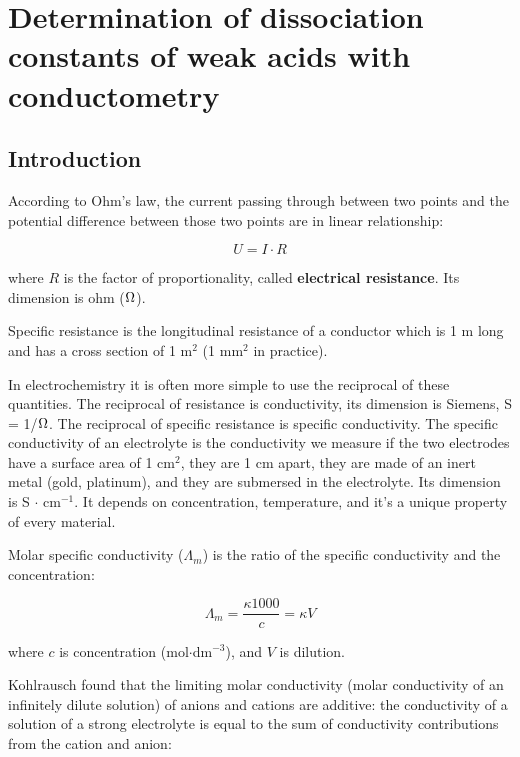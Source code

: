 \fancyhead[LO,RE]{\thesection}
\fancyfoot[LE,RO]{\thepage}

\section{Determination of dissociation constants of weak acids with conductometry}
\subsection{Introduction}
According to Ohm's law, the current passing through between two points and the potential difference between those two points are in linear relationship:

\begin{equation}
\label{eq:ohm}
	U
	=
	I
	\cdot
	R
\end{equation}

where $R$ is the factor of proportionality, called \textbf{electrical resistance}. Its dimension is ohm ($\ohm$).

Specific resistance is the longitudinal resistance of a conductor which is 1 m long and has a cross section of 1 m$^2$ (1 mm$^2$ in practice). 

In electrochemistry it is often more simple to use the reciprocal of these quantities. The reciprocal of resistance is conductivity, its dimension is Siemens, S = 1/$\ohm$. The reciprocal of specific resistance is specific conductivity. The specific conductivity of an electrolyte is the conductivity we measure if the two electrodes have a surface area of 1 cm$^2$, they are 1 cm apart, they are made of an inert metal (gold, platinum), and they are submersed in the electrolyte. Its dimension is S $\cdot$ cm$^{-1}$. It depends on concentration, temperature, and it's a unique property of every material.

Molar specific conductivity ($\Lambda _m$) is the ratio of the specific conductivity and the concentration:

\begin{equation}
\label{eq:lambdam}
        \Lambda_m
        =
        \frac
		{\kappa 1000 }
		{c}
	=
	\kappa V
\end{equation}

where $c$ is concentration (mol$\cdot$dm$^{-3}$), and $V$ is dilution.

Kohlrausch found that the limiting molar conductivity (molar conductivity of an infinitely dilute solution) of anions and cations are additive: the conductivity of a solution of a strong electrolyte is equal to the sum of conductivity contributions from the cation and anion:

